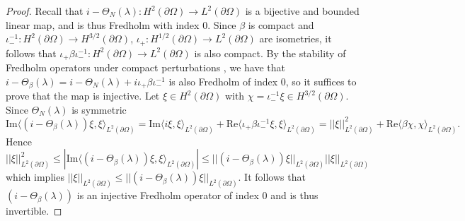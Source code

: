 \documentclass{article}
\numberwithin{equation}{section}
\begin{document}
    \begin{proof}
        Recall that $i - \Theta_N(\lambda):H^2(\partial \Omega)\to L^2(\partial \Omega)$ is a bijective and bounded linear map, and is thus Fredholm with index $0$. Since $\beta$ is compact and $\iota_-^{-1}:H^2(\partial \Omega) \to H^{3/2}(\partial \Omega)$, $\iota_+:H^{1/2}(\partial \Omega)\to L^2(\partial \Omega)$ are isometries, it follows that $\iota_+ \beta \iota_-^{-1}:H^2(\partial \Omega)\to L^2(\partial \Omega)$ is also compact. By the stability of Fredholm operators under compact perturbations \cite{Brezis}, we have that $i-\Theta_\beta(\lambda)=i-\Theta_N(\lambda)+ i\iota_+ \beta \iota_-^{-1}$ is also Fredholm of index $0$, so it suffices to prove that the map is injective. Let $\xi \in H^2(\partial \Omega)$ with $\chi=\iota_-^{-1}\xi \in H^{3/2}(\partial \Omega)$. Since $\Theta_N(\lambda)$ is symmetric
        \begin{equation}
            \text{Im} \langle (i - \Theta_\beta(\lambda))\xi, \xi \rangle_{L^2(\partial \Omega)}= \text{Im} \langle i\xi,\xi \rangle_{L^2(\partial \Omega)} + \text{Re} \langle \iota_+ \beta \iota_-^{-1}\xi,\xi \rangle_{L^2(\partial \Omega)}= ||\xi||^2_{L^2(\partial \Omega)} + \text{Re} \langle \beta \chi,\chi \rangle_{L^2(\partial \Omega)}.
        \end{equation}
        Hence 
        \begin{equation}
            ||\xi||_{L^2(\partial \Omega)}^2 \leq | \text{Im} \langle (i - \Theta_\beta(\lambda))\xi, \xi \rangle_{L^2(\partial \Omega)} | \leq ||(i - \Theta_\beta(\lambda)) \xi||_{L^2(\partial \Omega)} ||\xi||_{L^2(\partial \Omega)}
        \end{equation}
        which implies $||\xi||_{L^2(\partial \Omega)}\leq ||(i - \Theta_\beta(\lambda)) \xi ||_{L^2(\partial \Omega)}$. It follows that $(i-\Theta_\beta(\lambda))$ is an injective Fredholm operator of index $0$ and is thus invertible.
    \end{proof}
\end{document}
